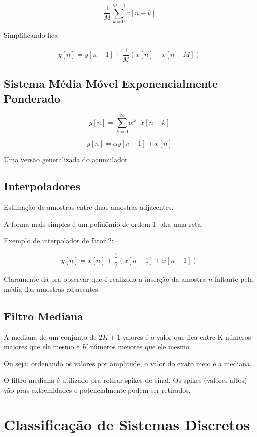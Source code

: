    \[\dfrac{1}{M} \sum_{k = 0}^{M - 1} x[n - k]\]

   Simplificando fica

   \[y[n] = y[n - 1] + \dfrac{1}{M}(x[n] - x[n - M])\]

\subsection{Sistema Média Móvel Exponencialmente Ponderado}

\[y[n] = \sum_{k = 0}^{\infty}\alpha^{k} \cdot x[n - k]  \]

\[y[n] = \alpha y[n - 1] + x[n]\]

Uma versão generalizada do acumulador.

\subsection{Interpoladores}

Estimação de amostras entre duas amostras adjacentes.

A forma mais simples é um polinômio de ordem 1, aka uma reta.

Exemplo de interpolador de fator 2:

\[y[n] = x[n] + \dfrac{1}{2}(x[n - 1] + x[n + 1])\]

Claramente dá pra observar que é realizada a inserção da amostra $n$ faltante pela média das amostras adjacentes.

\subsection{Filtro Mediana}

\begin{definition}
    A mediana de um conjunto de $2K + 1$ valores é o valor que fica entre K números maiores que ele mesmo e $K$ números menores que ele mesmo.

\end{definition}

Ou seja: ordenando os valores por amplitude, o valor do exato meio é a mediana.

O filtro mediana é utilizado pra retirar spikes do sinal. Os spikes (valores altos) vão pras extremidades e potencialmente podem ser retirados.

\section{Classificação de Sistemas Discretos}

